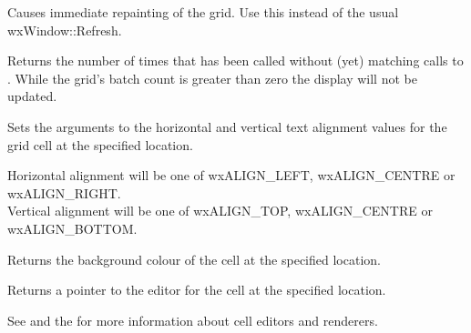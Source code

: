 \label{wxgridforcerefresh}


Causes immediate repainting of the grid. Use this instead of the usual wxWindow::Refresh.

\label{wxgridgetbatchcount}


Returns the number of times that  has been called
without (yet) matching calls to . While
the grid's batch count is greater than zero the display will not be updated.

\label{wxgridgetcellalignment}


Sets the arguments to the horizontal and vertical text alignment values for the
grid cell at the specified location.

Horizontal alignment will be one of wxALIGN\_LEFT, wxALIGN\_CENTRE or wxALIGN\_RIGHT. \\
Vertical alignment will be one of wxALIGN\_TOP, wxALIGN\_CENTRE or wxALIGN\_BOTTOM.


\label{wxgridgetcellbackgroundcolour}


Returns the background colour of the cell at the specified location.

\label{wxgridgetcelleditor}


Returns a pointer to the editor for the cell at the specified location.

See  and
the  for more information about cell editors and renderers.

\label{wxgridgetcellfont}

